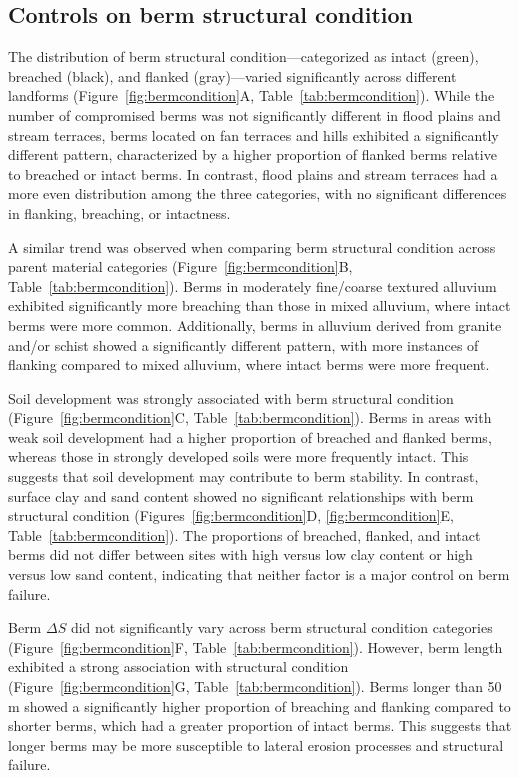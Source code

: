 \documentclass[review]{elsarticle}
\begin{document}
\subsection{Controls on berm structural condition}

The distribution of berm structural condition—categorized as intact (green), breached (black), and flanked (gray)—varied significantly across different landforms (Figure~\ref{fig:bermcondition}A, Table~\ref{tab:bermcondition}). While the number of compromised berms was not significantly different in flood plains and stream terraces, berms located on fan terraces and hills exhibited a significantly different pattern, characterized by a higher proportion of flanked berms relative to breached or intact berms. In contrast, flood plains and stream terraces had a more even distribution among the three categories, with no significant differences in flanking, breaching, or intactness.

A similar trend was observed when comparing berm structural condition across parent material categories (Figure~\ref{fig:bermcondition}B, Table~\ref{tab:bermcondition}). Berms in moderately fine/coarse textured alluvium exhibited significantly more breaching than those in mixed alluvium, where intact berms were more common. Additionally, berms in alluvium derived from granite and/or schist showed a significantly different pattern, with more instances of flanking compared to mixed alluvium, where intact berms were more frequent.

Soil development was strongly associated with berm structural condition (Figure~\ref{fig:bermcondition}C, Table~\ref{tab:bermcondition}). Berms in areas with weak soil development had a higher proportion of breached and flanked berms, whereas those in strongly developed soils were more frequently intact. This suggests that soil development may contribute to berm stability. In contrast, surface clay and sand content showed no significant relationships with berm structural condition (Figures~\ref{fig:bermcondition}D, \ref{fig:bermcondition}E, Table~\ref{tab:bermcondition}). The proportions of breached, flanked, and intact berms did not differ between sites with high versus low clay content or high versus low sand content, indicating that neither factor is a major control on berm failure.

Berm $\Delta S$ did not significantly vary across berm structural condition categories (Figure~\ref{fig:bermcondition}F, Table~\ref{tab:bermcondition}). However, berm length exhibited a strong association with structural condition (Figure~\ref{fig:bermcondition}G, Table~\ref{tab:bermcondition}). Berms longer than 50 m showed a significantly higher proportion of breaching and flanking compared to shorter berms, which had a greater proportion of intact berms. This suggests that longer berms may be more susceptible to lateral erosion processes and structural failure.
\end{document}
